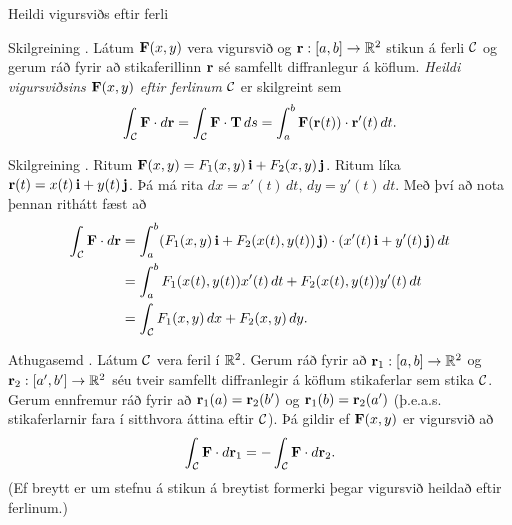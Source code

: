 \begin{frame}{Heildi vigursviðs eftir ferli} 

\begin {block}{Skilgreining \kaflanr.}
Látum $\mbox{${\bf F}$}(x,y)$ vera vigursvið og $\mbox{${\bf r}$}:[a,b]\rightarrow {\mathbb R}^2$ stikun á ferli $\cal C$ og gerum ráð fyrir að stikaferillinn $\mbox{${\bf r}$}$ sé samfellt diffranlegur á köflum.  {\em Heildi vigursviðsins $\mbox{${\bf F}$}(x,y)$ eftir ferlinum} $\cal C$ er skilgreint sem 
$$\int_{\cal C} \mbox{${\bf F}$}\cdot d\mbox{${\bf r}$}= \int_{\cal C} \mbox{${\bf F}$}\cdot \mbox{${\bf T}$}\,ds
=\int_a^b \mbox{${\bf F}$}(\mbox{${\bf r}$}(t))\cdot \mbox{${\bf r}$}'(t)\,dt.$$
\end{block}

\end{frame}



\begin{frame}{} 

\begin {block}{Skilgreining \kaflanr.}
Ritum $\mbox{${\bf F}$}(x,y)=F_1(x,y)\,\mbox{${\bf i}$}+F_2(x,y)\,\mbox{${\bf j}$}$.  Ritum líka $\mbox{${\bf r}$}(t)=x(t)\,\mbox{${\bf i}$}+y(t)\,\mbox{${\bf j}$}$.  Þá má rita
$dx=x'(t)\,dt,\, dy=y'(t)\,dt$.  Með því að nota þennan rithátt fæst að 
\begin{align*}
\int_{\cal C}\mbox{${\bf F}$}\cdot d\mbox{${\bf r}$}&=\int_a^b
(F_1(x,y)\,\mbox{${\bf i}$}+F_2(x(t),y(t))\,\mbox{${\bf j}$})\cdot(x'(t)\,\mbox{${\bf i}$}+y'(t)\,\mbox{${\bf j}$})\,dt\\
&=\int_a^b F_1(x(t),y(t))x'(t)\,dt+F_2(x(t),y(t))y'(t)\,dt\\
&=\int_{\cal C} F_1(x,y)\,dx+F_2(x,y)\,dy.
\end{align*}
\end{block}

\end{frame}




\begin{frame}{} 

\begin {block}{Athugasemd \kaflanr.}
Látum $\cal C$ vera feril í ${\mathbb R}^2$. Gerum ráð fyrir að $\mbox{${\bf r}$}_1:[a,b]\rightarrow {\mathbb R}^2$ og  $\mbox{${\bf r}$}_2:[a',b']\rightarrow {\mathbb R}^2$ séu tveir samfellt diffranlegir á köflum stikaferlar sem stika $\cal C$.  Gerum ennfremur ráð fyrir að $\mbox{${\bf r}$}_1(a)=\mbox{${\bf r}$}_2(b')$ og $\mbox{${\bf r}$}_1(b)=\mbox{${\bf r}$}_2(a')$ (þ.e.a.s. stikaferlarnir fara í sitthvora áttina eftir $\cal C$).  Þá gildir ef $\mbox{${\bf F}$}(x,y)$ er vigursvið að 
$$\int_{\cal C} \mbox{${\bf F}$}\cdot d\mbox{${\bf r}$}_1=-\int_{\cal C} \mbox{${\bf F}$}\cdot d\mbox{${\bf r}$}_2.$$
(Ef breytt er um stefnu á stikun á breytist formerki þegar vigursvið heildað eftir ferlinum.)
\end{block}

\end{frame}
